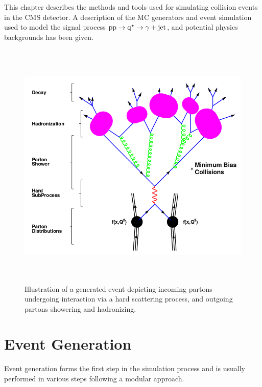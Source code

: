 This chapter describes the methods and tools used for simulating \pp collision events in the CMS detector. A description of the
MC generators and event simulation used to model the signal process $\mathrm{pp}\rightarrow\mathrm{q^\star}\rightarrow\gamma+\mathrm{jet}$, and potential physics backgrounds
has been given.

\begin{figure}[h!]
\centering
\includegraphics[width=14cm,height=12cm]{ch3/figures/EventGeneration.png}
\caption{Illustration of a generated event depicting incoming partons undergoing interaction via a hard scattering process, and outgoing partons
showering and hadronizing.}
\label{fig:EventGeneration}
\end{figure}

\section{Event Generation}
Event generation forms the first step in the simulation process and is usually performed in various steps following a modular approach.

